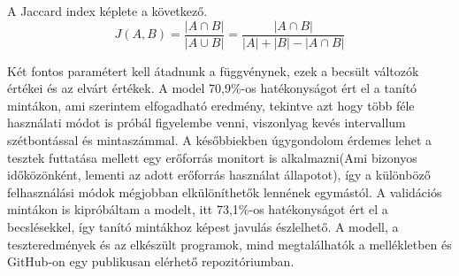 A Jaccard index képlete a következő.
\begin{equation}
J(A,B) = \frac{|A \cap B|}{|A \cup B|} = \frac{|A \cap B|}{|A| + |B| - |A \cap B|}
\end{equation}

Két fontos paramétert kell átadnunk a függvénynek, ezek a becsült változók értékei és az elvárt értékek.
A model 70,9\%-os hatékonyságot ért el a tanító mintákon, ami szerintem elfogadható eredmény, tekintve azt hogy több féle használati módot is próbál figyelembe venni, viszonlyag kevés intervallum szétbontással és mintaszámmal. A későbbiekben úgygondolom érdemes lehet a tesztek futtatása mellett egy erőforrás monitort is alkalmazni(Ami bizonyos időközönként, lementi az adott erőforrás használat állapotot), így a különböző felhasználási módok mégjobban elkülöníthetők lennének egymástól.
A validációs mintákon is kipróbáltam a modelt, itt 73,1\%-os hatékonyságot ért el a becslésekkel, így tanító mintákhoz képest javulás észlelhető.
A modell, a teszteredmények és az elkészült programok, mind megtalálhatók a mellékletben és GitHub-on egy publikusan elérhető repozitóriumban.


